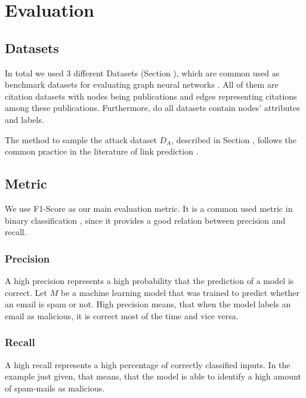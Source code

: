 \chapter{Evaluation}

    \section{Datasets}
        In total we used 3 different Datasets (Section ), which are common used as benchmark datasets for evaluating graph neural networks \cite{acharya2019feature, gao2019graphnas, gcn}.
        All of them are citation datasets with nodes being publications and edges representing citations among these publications.        
        Furthermore, do all datasets contain nodes' attributes and labels.

        The method to sample the attack dataset $D_A$, described in Section , follows the common practice in the literature of link prediction \cite{BHPZ17, grover2016node2vec}.

    \section{Metric}

        We use F1-Score as our main evaluation metric.
        It is a common used metric in binary classification \cite{lipton2014thresholding, santus2016features, woodbridge2016predicting}, since it provides a good relation between precision and recall.

        \subsection{Precision}
            A high precision represents a high probability that the prediction of a model is correct.
            Let $M$ be a machine learning model that was trained to predict whether an email is spam or not.
            High precision means, that when the model labels an email as malicious, it is correct most of the time and vice versa.

        \subsection{Recall}
            A high recall represents a high percentage of correctly classified inputs.
            In the example just given, that means, that the model is able to identify a high amount of spam-mails as malicious.


